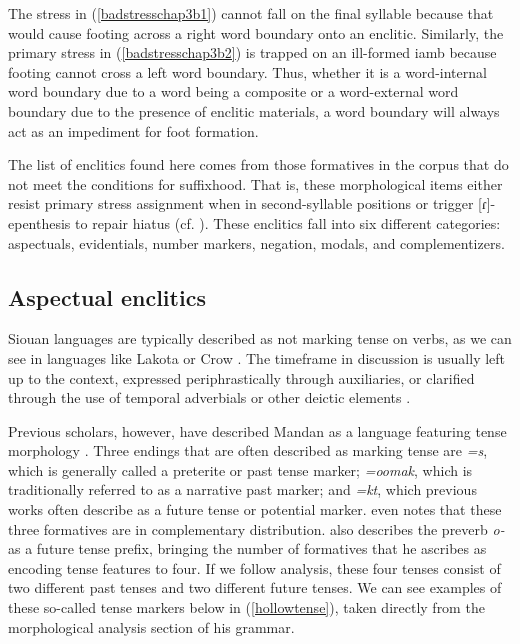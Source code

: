The stress in (\ref{badstresschap3b1}) cannot fall on the final syllable because that would cause footing across a right word boundary onto an enclitic. Similarly, the primary stress in (\ref{badstresschap3b2}) is trapped on an ill-formed iamb because footing cannot cross a left word boundary. Thus, whether it is a word-internal word boundary due to a word being a composite or a word-external word boundary due to the presence of enclitic materials, a word boundary will always act as an impediment for foot formation.

The list of enclitics found here comes from those formatives in the corpus that do not meet the conditions for suffixhood. That is, these morphological items either resist primary stress assignment when in second-syllable positions or trigger [ɾ]-epenthesis to repair hiatus (cf. ). These enclitics fall into six different categories: aspectuals, evidentials, number markers, negation, modals, and complementizers.

\subsection{Aspectual enclitics}

Siouan languages are typically described as not marking tense on verbs, as we can see in languages like Lakota \citep[27]{ullrichblackbear2016} or Crow \citep[7]{graczyk2007}. The timeframe in discussion is usually left up to the context, expressed periphrastically through auxiliaries, or clarified through the use of temporal adverbials or other deictic elements \citep{rankin1977}.

Previous scholars, however, have described Mandan as a language featuring tense morphology \citep{kennard1936,hollow1970,mixco1997a}. Three endings that are often described as marking tense are \textit{=s}, which is generally called a preterite or past tense marker; \textit{=oomak}, which is traditionally referred to as a narrative past marker; and \textit{=kt}, which previous works often describe as a future tense or potential marker. \citet[454]{hollow1970} even notes that these three formatives are in complementary distribution. \citet{hollow1970} also describes the preverb \textit{o-} as a future tense prefix, bringing the number of formatives that he ascribes as encoding tense features to four. If we follow  analysis, these four tenses consist of two different past tenses and two different future tenses. We can see examples of these so-called tense markers below in (\ref{hollowtense}), taken directly from the morphological analysis section of his grammar.

